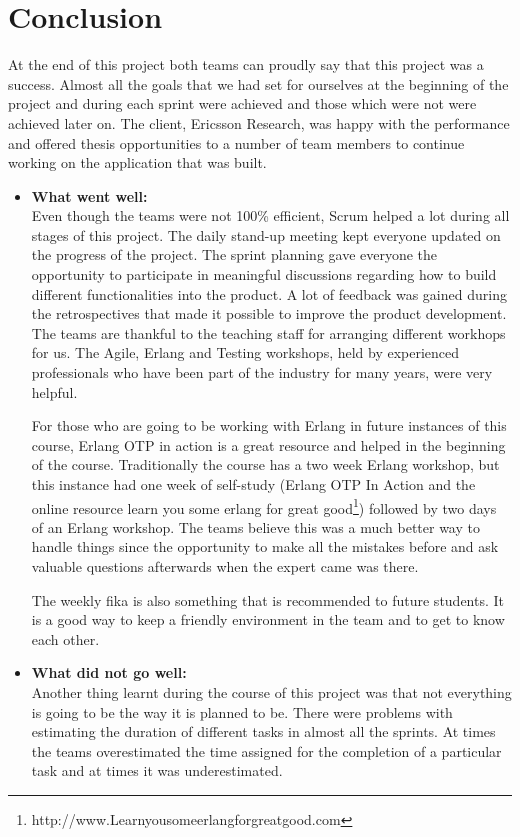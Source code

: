 \section{Conclusion}
At the end of this project both teams can proudly say that this project was a success. 
Almost all the goals that we had set for ourselves at the beginning of the project 
and during each sprint were achieved and those which were not were achieved later on. The client, Ericsson Research, was happy with the performance and 
offered thesis opportunities to a number of team members to continue working on the 
application that was built. 

\begin{itemize}
\item{\textbf{What went well:}}\\
Even though the teams were not 100\% efficient, Scrum helped a lot 
during all stages of this project. The daily stand-up meeting kept everyone updated on the 
progress of the project. The sprint planning gave everyone the opportunity 
to participate in meaningful discussions regarding how to build different functionalities into the product. A lot of feedback was gained during the retrospectives that made it possible
to improve the product development. The teams are thankful to the teaching staff for arranging different workhops for us. 
The Agile, Erlang and Testing workshops, held by experienced professionals who have been part of the 
industry for many years, were very helpful. 

For those who are going to be working with Erlang in future instances of this course, Erlang 
OTP in action is a great resource and helped in the beginning of the course. Traditionally 
the course has a two week Erlang workshop, but this instance had one week of self-study (Erlang OTP In Action and 
the online resource learn you some erlang for great good\footnote{http://www.Learnyousomeerlangforgreatgood.com}) 
followed by two days of an Erlang workshop. The teams believe this was a much better way to handle things since the opportunity to 
make all the mistakes before and ask valuable questions afterwards when the expert came was there. 

The weekly fika is also something that is recommended to future students. It is a 
good way to keep a friendly environment in the team and to get to know each other.     

\item{\textbf{What did not go well:}}\\ 
Another thing learnt during the course of this project was that not everything is going to be 
the way it is planned to be. There were problems with estimating the duration of different tasks in almost all 
the sprints. At times the teams overestimated the time assigned for the completion of a particular task and 
at times it was underestimated. 


\end{itemize}
